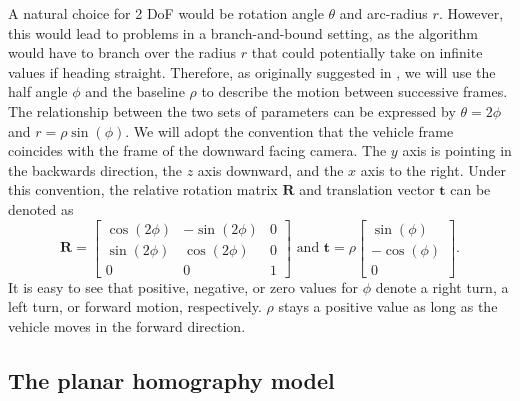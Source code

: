 \documentclass[letterpaper, 10 pt, conference]{ieeeconf}  %
\begin{document}
A natural choice for 2 DoF would be rotation angle $\theta$ and arc-radius $r$. However, this would lead to problems in a branch-and-bound setting, as the algorithm would have to branch over the radius $r$ that could potentially take on infinite values if heading straight. Therefore, as originally suggested in \cite{scaramuzza2009real}, we will use the half angle $\phi$ and the baseline $\rho$ to describe the motion between successive frames. The relationship between the two sets of parameters can be expressed by $\theta = 2 \phi$ and $r = \rho \sin(\phi)$. We will adopt the convention that the vehicle frame coincides with the frame of the downward facing camera. The $y$ axis is pointing in the backwards direction, the $z$ axis downward, and the $x$ axis to the right. Under this convention, the relative rotation matrix $\mathbf{R}$ and translation vector $\mathbf{t}$ can be denoted as
%
\begin{equation}
	\label{Rotation_Matrix}
	\textbf{R} = \left[
    				\begin{matrix}
						\cos\!\left(2\phi\right) & - \sin\!\left(2\phi\right) & 0 \\
						\sin\!\left(2\phi\right) &   \cos\!\left(2\phi\right) & 0 \\
						0 & 0 & 1
	  				\end{matrix}
  			   	 \right] \text{ and }
	\textbf{t} = \rho \left[
    					\begin{matrix}
			   				  \sin\!\left(\phi\right) \\
			   				- \cos\!\left(\phi\right) \\
			   				                        0
  						\end{matrix}
  					  \right].
\end{equation}
%
It is easy to see that positive, negative, or zero values for $\phi$ denote a right turn, a left turn, or forward motion, respectively. $\rho$ stays a positive value as long as the vehicle moves in the forward direction.

\subsection{The planar homography model}
\end{document}
